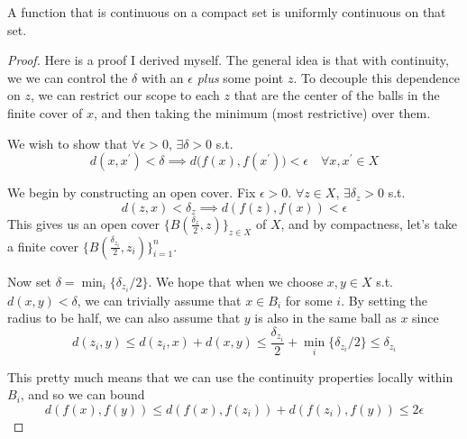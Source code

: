   \begin{theorem}
    \label{thm:cantors-theorem-on-uniform-continuity}
    A function that is continuous on a compact set is uniformly continuous on that set. 
  \end{theorem}
  \begin{proof}
    Here is a proof I derived myself. The general idea is that with continuity, we we can control the $\delta$ with an $\epsilon$ \textit{plus} some point $z$. To decouple this dependence on $z$, we can restrict our scope to each $z$ that are the center of the balls in the finite cover of $x$, and then taking the minimum (most restrictive) over them. 

    We wish to show that $\forall \epsilon > 0$, $\exists \delta > 0$ s.t. 
    \begin{equation}
      d(x, x^\prime) < \delta \implies d\big( f(x), f(x^\prime) \big) < \epsilon \quad \forall x, x^\prime \in X
    \end{equation} 

    We begin by constructing an open cover. Fix $\epsilon > 0$. $\forall z \in X$, $\exists \delta_z > 0$ s.t. 
    \begin{equation}
      d(z, x) < \delta_z \implies d(f(z), f(x)) < \epsilon
    \end{equation}
    This gives us an open cover $\{B(\frac{\delta_z}{2}, z)\}_{z \in X}$ of $X$, and by compactness, let's take a finite cover $\{B(\frac{\delta_{z_i}}{2}, z_i)\}_{i=1}^n$. 

    Now set $\delta = \min_i \{\delta_{z_i}/2\}$. We hope that when we choose $x, y \in X$ s.t. $d(x, y) < \delta$, we can trivially assume that $x \in B_i$ for some $i$. By setting the radius to be half, we can also assume that $y$ is also in the same ball as $x$ since 
    \begin{equation}
      d(z_i, y) \leq d(z_i, x) + d(x, y) \leq \frac{\delta_{z_i}}{2} + \min_i \{\delta_{z_i}/2\} \leq \delta_{z_i}
    \end{equation} 

    This pretty much means that we can use the continuity properties locally within $B_i$, and so we can bound
    \begin{equation}
      d(f(x), f(y)) \leq d(f(x), f(z_i)) + d(f(z_i), f(y)) \leq 2 \epsilon
    \end{equation}
  \end{proof}
